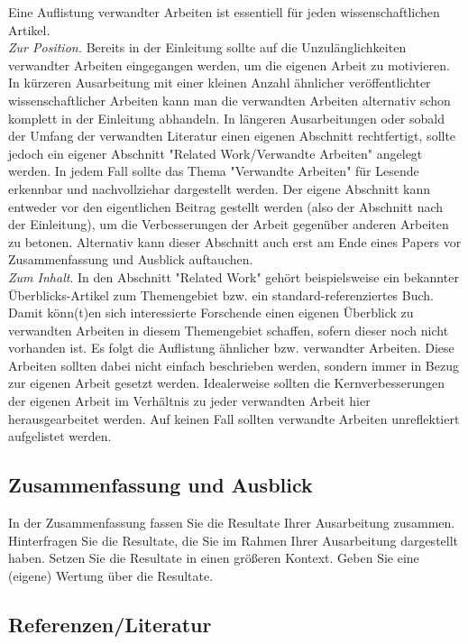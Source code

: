 \documentclass[lang=english]{secseminar}
\begin{document}
Eine Auflistung verwandter Arbeiten ist essentiell für jeden wissenschaftlichen Artikel.\\

\noindent
\emph{Zur Position.}
Bereits in der Einleitung sollte auf die Unzulänglichkeiten verwandter Arbeiten eingegangen werden,
um die eigenen Arbeit zu motivieren.
In kürzeren Ausarbeitung mit einer kleinen Anzahl ähnlicher veröffentlichter wissenschaftlicher
Arbeiten kann man die verwandten Arbeiten alternativ schon komplett in der Einleitung abhandeln.
In längeren Ausarbeitungen oder sobald der Umfang der verwandten Literatur einen eigenen Abschnitt
rechtfertigt, sollte jedoch ein eigener Abschnitt "Related Work/Verwandte Arbeiten" angelegt werden.
In jedem Fall sollte das Thema "Verwandte Arbeiten" für Lesende erkennbar und nachvollziehar
dargestellt werden.
Der eigene Abschnitt kann entweder vor den eigentlichen Beitrag gestellt werden (also der Abschnitt
nach der Einleitung), um die Verbesserungen der Arbeit gegenüber anderen Arbeiten zu betonen.
Alternativ kann dieser Abschnitt auch erst am Ende eines Papers vor Zusammenfassung und Ausblick
auftauchen.\\

\noindent
\emph{Zum Inhalt}.
In den Abschnitt "Related Work" gehört beispielsweise ein bekannter Überblicks-Artikel zum
Themengebiet bzw. ein standard-referenziertes Buch.
Damit könn(t)en sich interessierte Forschende einen eigenen Überblick zu verwandten Arbeiten in
diesem Themengebiet schaffen, sofern dieser noch nicht vorhanden ist.
Es folgt die Auflistung ähnlicher bzw. verwandter Arbeiten.
Diese Arbeiten sollten dabei nicht einfach beschrieben werden, sondern immer in Bezug zur eigenen
Arbeit gesetzt werden.
Idealerweise sollten die Kernverbesserungen der eigenen Arbeit im Verhältnis zu jeder verwandten
Arbeit hier herausgearbeitet werden.
Auf keinen Fall sollten verwandte Arbeiten unreflektiert aufgelistet werden.

\subsection{Zusammenfassung und Ausblick}
In der Zusammenfassung fassen Sie die Resultate Ihrer Ausarbeitung zusammen. Hinterfragen Sie die
Resultate, die Sie im Rahmen Ihrer Ausarbeitung dargestellt haben. Setzen Sie die Resultate in einen
größeren Kontext. Geben Sie eine (eigene) Wertung über die Resultate.

\subsection{Referenzen/Literatur} \label{subsec:referenzen}
\end{document}
